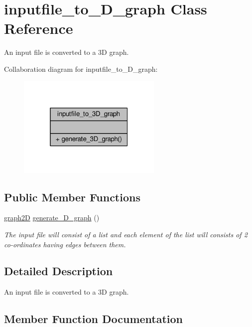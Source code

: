 \hypertarget{classinputfile__to__3D__graph}{}\section{inputfile\+\_\+to\+\_\+D\+\_\+graph Class Reference}
\label{classinputfile__to__3D__graph}


An input file is converted to a 3D graph.  




Collaboration diagram for inputfile\+\_\+to\+\_\+D\+\_\+graph\+:\nopagebreak
\begin{figure}[H]
\begin{center}
\leavevmode
\includegraphics[width=196pt]{classinputfile__to__3D__graph__coll__graph}
\end{center}
\end{figure}
\subsection*{Public Member Functions}
\begin{DoxyCompactItemize}
\item 
\hyperlink{classgraph2D}{graph2D} \hyperlink{classinputfile__to__3D__graph_ab066fee3040885308398fa1033166a3b}{generate\+\_\+D\+\_\+graph} ()
\begin{DoxyCompactList}\small\item\em The input file will consist of a list and each element of the list will consists of 2 co-\/ordinates having edges between them. \end{DoxyCompactList}\end{DoxyCompactItemize}


\subsection{Detailed Description}
An input file is converted to a 3D graph. 

\subsection{Member Function Documentation}
